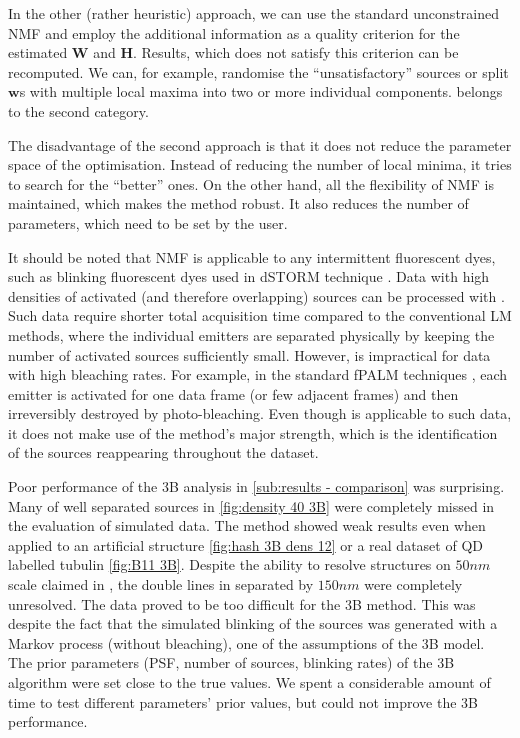 In the other (rather heuristic) approach, we can use the standard unconstrained NMF and employ the additional information as a quality criterion for the estimated $\bm{W}$ and $\bm{H}$. Results, which does not satisfy this criterion can be recomputed. We can, for example, randomise the ``unsatisfactory'' sources or split $\bm{w}$s with multiple local maxima into two or more individual components. \inmf{} belongs to the second category.

The disadvantage of the second approach is that it does not reduce the parameter space of the optimisation. Instead of reducing the number of local minima, it tries to search for the ``better'' ones. On the other hand, all the flexibility of NMF is maintained, which makes the method robust. It also reduces the number of parameters, which need to be set by the user.

It should be noted that NMF is applicable to any intermittent fluorescent dyes, such as blinking fluorescent dyes used in dSTORM technique \cite{VandeLinde2011}. Data with high densities of activated (and therefore overlapping) sources can be processed with \inmf{}. Such data require shorter total acquisition time compared to the conventional LM methods, where the individual emitters are separated physically by keeping the number of activated sources sufficiently small. However, \inmf{} is impractical for data with high bleaching rates. For example, in the standard fPALM techniques \cite{Hess2006}, each emitter is activated for one data frame (or few adjacent frames) and then irreversibly destroyed by photo-bleaching.  Even though \inmf{} is applicable to such data, it does not make use of the method's major strength, which is the identification of the sources reappearing throughout the dataset.  
 
Poor performance of the 3B analysis in \autoref{sub:results - comparison} was surprising. Many of well separated sources in \autoref{fig:density 40 3B} were completely missed in the evaluation of simulated data. The method showed weak results even when applied to an artificial structure \autoref{fig:hash 3B  dens 12} or a real dataset of QD labelled tubulin \autoref{fig:B11 3B}. Despite the ability to resolve structures on $50 \unit{nm}$ scale claimed in \cite{Cox2011}, the double lines in  separated by $150 \unit{nm}$ were completely unresolved. The data proved to be too difficult for the 3B method. This was despite the fact that the simulated blinking of the sources was generated with a Markov process (without bleaching), one of the assumptions of the 3B model. The prior parameters (PSF, number of sources, blinking rates) of the 3B algorithm were set close to the true values. We spent a considerable amount of time to test different parameters' prior values, but could not improve the 3B performance.

